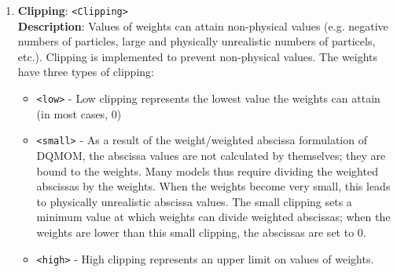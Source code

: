 \begin{enumerate}
{\bf Description}: Value by which to scale the weights. The actual values of the weights are very high, as the weights represent numbers of particles (typically greater than 1e6). Because the values of the weights are going into the $\mathbf{A}$ matrix, large weight values can cause $\mathbf{A}$ to become very ill-conditioned. Scaling the values of the weights can help control condition numbers for $\mathbf{A}$.
%
\item {\bf Clipping}: \verb=<Clipping>= \\
{\bf Description}: Values of weights can attain non-physical values (e.g. negative numbers of particles, large and physically unrealistic numbers of particels, etc.). Clipping is implemented to prevent non-physical values.  The weights have three types of clipping:
	\begin{itemize}
	\item \verb=<low>= - Low clipping represents the lowest value the weights can attain (in most cases, 0)
	\item \verb=<small>= - As a result of the weight/weighted abscissa formulation of DQMOM, the abscissa values are not calculated by themselves; they are bound to the weights. Many models thus require dividing the weighted abscissas by the weights. When the weights become very small, this leads to physically unrealistic abscissa values. The small clipping sets a minimum value at which weights can divide weighted abscissas; when the weights are lower than this small clipping, the abscissas are set to 0.
	\item \verb=<high>= - High clipping represents an upper limit on values of weights.
	\end{itemize}
%
\end{enumerate}



